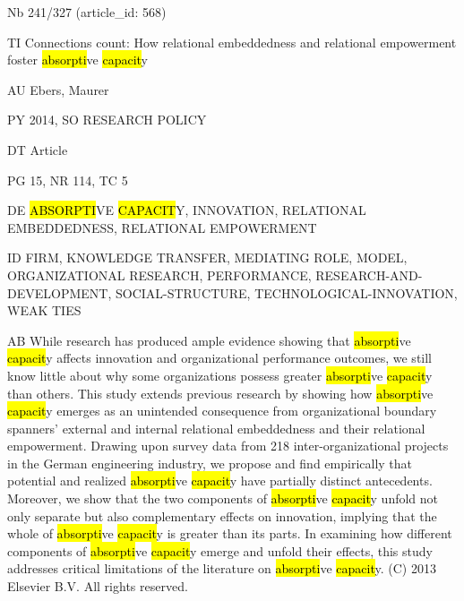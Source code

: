 \documentclass[a4paper]{article}
\begin{document}
\vspace*{-2cm}
Nb \tabto{0cm}241/327 (article\_id: 568)\par
TI \tabto{0cm}Connections count: How relational embeddedness and relational empowerment foster \hl{absorpti}ve \hl{capacit}y\par
AU \tabto{0cm}Ebers, Maurer\par
PY \tabto{0cm}2014, SO RESEARCH POLICY\par
DT \tabto{0cm}Article\par
PG \tabto{0cm}15, NR 114, TC 5\par
DE \tabto{0cm}\hl{ABSORPTI}VE \hl{CAPACIT}Y, INNOVATION, RELATIONAL EMBEDDEDNESS, RELATIONAL EMPOWERMENT\par
ID \tabto{0cm}FIRM, KNOWLEDGE TRANSFER, MEDIATING ROLE, MODEL, ORGANIZATIONAL RESEARCH, PERFORMANCE, RESEARCH-AND-DEVELOPMENT, SOCIAL-STRUCTURE, TECHNOLOGICAL-INNOVATION, WEAK TIES\par
AB \tabto{0cm}While research has produced ample evidence showing that \hl{absorpti}ve \hl{capacit}y affects innovation and organizational performance outcomes, we still know little about why some organizations possess greater \hl{absorpti}ve \hl{capacit}y than others. This study extends previous research by showing how \hl{absorpti}ve \hl{capacit}y emerges as an unintended consequence from organizational boundary spanners' external and internal relational embeddedness and their relational empowerment. Drawing upon survey data from 218 inter-organizational projects in the German engineering industry, we propose and find empirically that potential and realized \hl{absorpti}ve \hl{capacit}y have partially distinct antecedents. Moreover, we show that the two components of \hl{absorpti}ve \hl{capacit}y unfold not only separate but also complementary effects on innovation, implying that the whole of \hl{absorpti}ve \hl{capacit}y is greater than its parts. In examining how different components of \hl{absorpti}ve \hl{capacit}y emerge and unfold their effects, this study addresses critical limitations of the literature on \hl{absorpti}ve \hl{capacit}y. (C) 2013 Elsevier B.V. All rights reserved.\par
\clearpage
\end{document}
